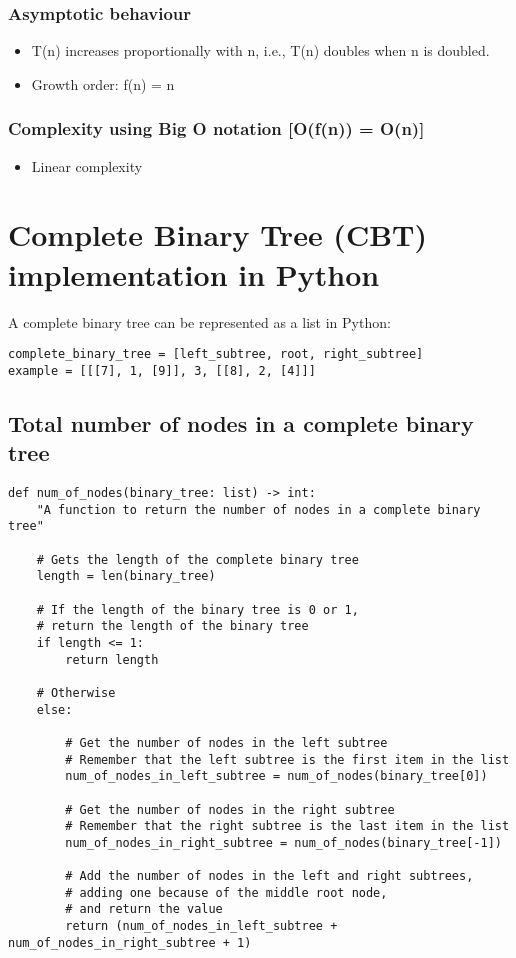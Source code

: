 \documentclass[11pt]{article}
\begin{document}
\subsubsection{Asymptotic behaviour}
\label{sec:orgf54f55f}
\begin{itemize}
\item T(n) increases proportionally with n, i.e., T(n) doubles when n is doubled.
\item Growth order: f(n) = n
\end{itemize}

\subsubsection{Complexity using Big O notation [O(f(n)) = O(n)]}
\label{sec:org96c1c13}
\begin{itemize}
\item Linear complexity
\end{itemize}

\section{Complete Binary Tree (CBT) implementation in Python}
\label{sec:org0a47f01}
A complete binary tree can be represented as a list in Python:
\begin{verbatim}
complete_binary_tree = [left_subtree, root, right_subtree]
example = [[[7], 1, [9]], 3, [[8], 2, [4]]]
\end{verbatim}

\subsection{Total number of nodes in a complete binary tree}
\label{sec:orga5f62be}
\begin{verbatim}
def num_of_nodes(binary_tree: list) -> int:
    "A function to return the number of nodes in a complete binary tree"

    # Gets the length of the complete binary tree
    length = len(binary_tree)

    # If the length of the binary tree is 0 or 1,
    # return the length of the binary tree
    if length <= 1:
        return length

    # Otherwise
    else:

        # Get the number of nodes in the left subtree
        # Remember that the left subtree is the first item in the list
        num_of_nodes_in_left_subtree = num_of_nodes(binary_tree[0])

        # Get the number of nodes in the right subtree
        # Remember that the right subtree is the last item in the list
        num_of_nodes_in_right_subtree = num_of_nodes(binary_tree[-1])

        # Add the number of nodes in the left and right subtrees,
        # adding one because of the middle root node,
        # and return the value
        return (num_of_nodes_in_left_subtree + num_of_nodes_in_right_subtree + 1)
\end{verbatim}
\end{document}
